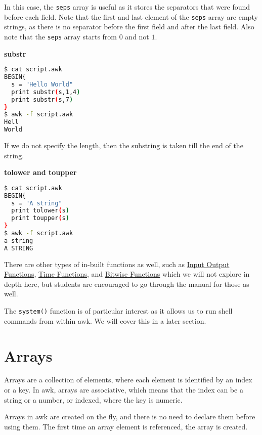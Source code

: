 In this case, the \lstinline|seps| array is useful as it stores the separators that were found before each field.
Note that the first and last element of the \lstinline|seps| array are empty strings, as there is no separator before the first field and after the last field.
Also note that the \lstinline|seps| array starts from $0$ and not $1$.

\textbf{substr}

\begin{lstlisting}[language=bash]
$ cat script.awk
BEGIN{
  s = "Hello World"
  print substr(s,1,4)
  print substr(s,7)
}
$ awk -f script.awk
Hell
World
\end{lstlisting}

If we do not specify the length, then the substring is taken till the end of the string.

\textbf{tolower and toupper}

\begin{lstlisting}[language=bash]
$ cat script.awk
BEGIN{
  s = "A string"
  print tolower(s)
  print toupper(s)
}
$ awk -f script.awk
a string
A STRING
\end{lstlisting}

There are other types of in-built functions as well, such as
\href{https://www.gnu.org/software/gawk/manual/html\_node/I\_002fO-Functions.html}{Input Output Functions},
\href{https://www.gnu.org/software/gawk/manual/html\_node/Time-Functions.html}{Time Functions}, and
\href{https://www.gnu.org/software/gawk/manual/html\_node/Bitwise-Functions.html}{Bitwise Functions}
which we will not explore in depth here, but students are encouraged to go through the manual for those as well.

The \lstinline|system()| function is of particular interest as it allows us to run shell commands from within awk. We will cover this in a later section.

\section{Arrays}

Arrays are a collection of elements, where each element is identified by an index or a key. In awk, arrays are associative, which means that the index can be a string or a number, or indexed, where the key is numeric.

Arrays in awk are created on the fly, and there is no need to declare them before using them. The first time an array element is referenced, the array is created.


